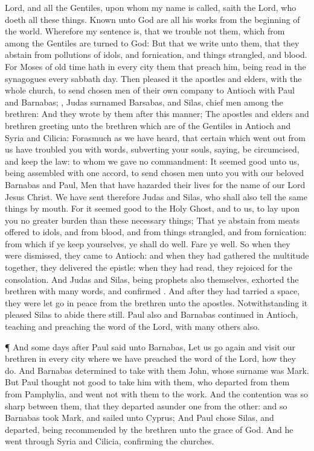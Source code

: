 {Lord,
and
all the
Gentiles,
upon
whom
my
name is
called,
saith the
Lord, who
doeth
all these
things.
Known unto
God
are
all
his
works
from the beginning of the
world.
Wherefore
my sentence
is, that we
trouble
not them,
which from
among the
Gentiles are
turned
to
God:
But that we
write unto
them, that they
abstain
from
pollutions of
idols,
and
{}
fornication,
and
{} things
strangled,
and
{}
blood.
For
Moses
of
old
time
hath in
every
city
them that
preach
him, being
read
in the
synagogues
every sabbath
day.
Then pleased
it the
apostles
and
elders,
with the
whole
church, to
send
chosen
men
of their own
company
to
Antioch
with
Paul
and
Barnabas;
{},
Judas
surnamed
Barsabas,
and
Silas,
chief
men
among the
brethren:
And they
wrote
{}
by
them after this
manner; The
apostles
and
elders
and
brethren
{}
greeting unto the
brethren
which are
of the
Gentiles
in
Antioch
and
Syria
and
Cilicia:
Forasmuch
as we have
heard,
that
certain which went
out
from
us have
troubled
you with
words,
subverting
your
souls,
saying,
{} be
circumcised,
and
keep the
law: to
whom we
gave
no
{}
commandment:
It seemed
good unto
us, being
assembled with one
accord, to
send
chosen
men
unto
you
with
our
beloved
Barnabas
and
Paul,
Men that have
hazarded
their
lives
for the
name of
our
Lord
Jesus
Christ.
We have
sent
therefore
Judas
and
Silas,
who
shall
also
tell
{} the same
things
by
mouth.
For it seemed
good to the
Holy
Ghost,
and to
us, to lay
upon
you
no
greater
burden
than
these
necessary
things;
That ye
abstain from meats offered to
idols,
and from
blood,
and from things
strangled,
and from
fornication:
from
which if ye
keep
yourselves, ye shall
do
well. Fare ye
well.
So
when they were
dismissed, they
came
to
Antioch:
and when they had
gathered the
multitude
together, they
delivered the
epistle:
when they had
read, they
rejoiced
for the
consolation.
And
Judas
and
Silas,
being
prophets
also
themselves,
exhorted the
brethren
with
many
words,
and
confirmed
{}.
And after they had
tarried
{} a
space, they were let
go
in
peace
from the
brethren
unto the
apostles.
Notwithstanding it
pleased
Silas to
abide
there
still.
Paul
also
and
Barnabas
continued
in
Antioch,
teaching
and
preaching the
word of the
Lord,
with
many
others
also.
\par }{\PP {}¶
And
some
days
after
Paul
said
unto
Barnabas, Let us go
again
and
visit
our
brethren
in
every
city
where we have
preached the
word of the
Lord,
{}
how they
do.
And
Barnabas
determined to take with
them
John, whose surname
was
Mark.
But
Paul
thought
not
good to take
him with
them,
who
departed
from
them
from
Pamphylia,
and
went
not with
them
to the
work.
And the
contention
was so sharp between
them,
that they departed
asunder
one
from the
other: and
so
Barnabas
took
Mark, and
sailed
unto
Cyprus;
And
Paul
chose
Silas, and
departed, being
recommended
by the
brethren unto the
grace of
God.
And he went
through
Syria
and
Cilicia,
confirming the
churches.

}
